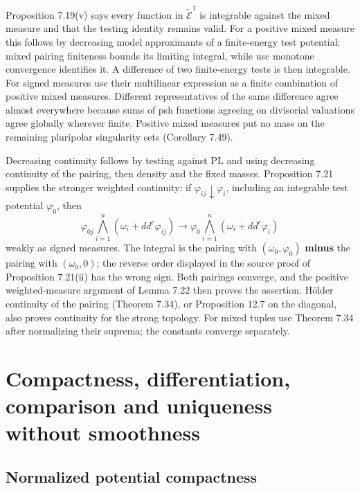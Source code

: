 \documentclass[11pt]{article}
\begin{document}
Proposition 7.19(v) says every function in \(\widetilde{\mathcal E}^1\)
is integrable against the mixed measure and that the testing identity
remains valid. For a positive mixed measure this follows by decreasing
model approximants of a finite-energy test potential: mixed pairing
finiteness bounds its limiting integral, while usc monotone convergence
identifies it. A difference of two finite-energy tests is then
integrable. For signed measures use their multilinear expression as a
finite combination of positive mixed measures. Different representatives
of the same difference agree almost everywhere because sums of psh
functions agreeing on divisorial valuations agree globally wherever
finite. Positive mixed measures put no mass on the remaining pluripolar
singularity sets (Corollary 7.49).

Decreasing continuity follows by testing against PL and using decreasing
continuity of the pairing, then density and the fixed masses.
Proposition 7.21 supplies the stronger weighted continuity: if
\(\varphi_{ij}\downarrow\varphi_i\), including an integrable test
potential \(\varphi_0\), then
\[\varphi_{0j}\bigwedge_{i=1}^n(\omega_i+dd^c\varphi_{ij})
\longrightarrow
\varphi_0\bigwedge_{i=1}^n(\omega_i+dd^c\varphi_i)\] weakly as signed
measures. The integral is the pairing with \((\omega_0,\varphi_0)\)
\textbf{minus} the pairing with \((\omega_0,0)\); the reverse order
displayed in the source proof of Proposition 7.21(ii) has the wrong
sign. Both pairings converge, and the positive weighted-measure argument
of Lemma 7.22 then proves the assertion. Hölder continuity of the
pairing (Theorem 7.34), or Proposition 12.7 on the diagonal, also proves
continuity for the strong topology. For mixed tuples use Theorem 7.34
after normalizing their suprema; the constants converge separately.

\section{Compactness, differentiation, comparison and uniqueness without
smoothness}\label{compactness-differentiation-comparison-and-uniqueness-without-smoothness}

\subsection{Normalized potential
compactness}\label{normalized-potential-compactness}
\end{document}
